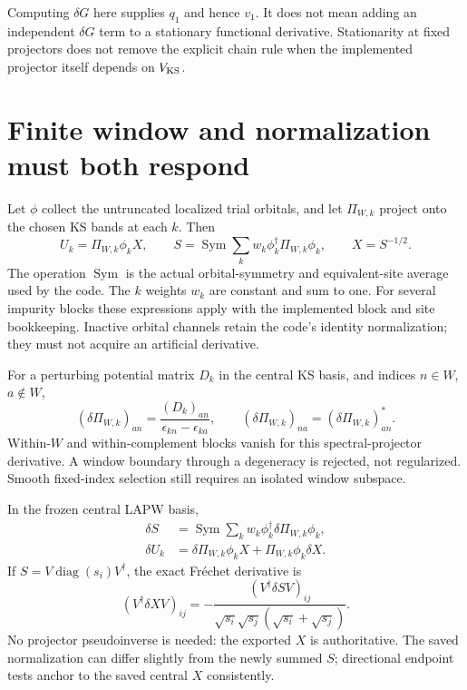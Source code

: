 \documentclass[11pt]{article}
\newcommand{\Sym}{\operatorname{Sym}}
\begin{document}
Computing $\delta G$ here supplies $q_1$ and hence $v_1$. It does not mean
adding an independent $\delta G$ term to a stationary functional derivative.
Stationarity at fixed projectors does not remove the explicit chain rule
when the implemented projector itself depends on $V_{\rm KS}$.

\section{Finite window and normalization must both respond}
Let $\phi$ collect the untruncated localized trial orbitals, and let
$\Pi_{W,k}$ project onto the chosen KS bands at each $k$. Then
\begin{equation}
 U_k=\Pi_{W,k}\phi_k X,\qquad
 S=\Sym\sum_k w_k\phi_k^\dagger\Pi_{W,k}\phi_k,\qquad X=S^{-1/2}.
 \label{eq:projector}
\end{equation}
The operation $\Sym$ is the actual orbital-symmetry and equivalent-site
average used by the code. The $k$ weights $w_k$ are constant and sum to one.
For several impurity blocks these expressions apply with the implemented
block and site bookkeeping. Inactive orbital channels retain the code's
identity normalization; they must not acquire an artificial derivative.

For a perturbing potential matrix $D_k$ in the central KS basis, and
indices $n\in W$, $a\notin W$,
\begin{equation}
 (\delta\Pi_{W,k})_{an}=\frac{(D_k)_{an}}{\epsilon_{kn}-\epsilon_{ka}},
 \qquad
 (\delta\Pi_{W,k})_{na}=(\delta\Pi_{W,k})_{an}^*.
 \label{eq:pi}
\end{equation}
Within-$W$ and within-complement blocks vanish for this spectral-projector
derivative. A window boundary through a degeneracy is rejected, not
regularized. Smooth fixed-index selection still requires an isolated
window subspace.

In the frozen central LAPW basis,
\begin{align}
 \delta S&=\Sym\sum_k w_k\phi_k^\dagger\delta\Pi_{W,k}\phi_k,\\
 \delta U_k&=\delta\Pi_{W,k}\phi_kX+\Pi_{W,k}\phi_k\delta X.
 \label{eq:du}
\end{align}
If $S=V\operatorname{diag}(s_i)V^\dagger$, the exact Fr\'echet derivative is
\begin{equation}
 (V^\dagger\delta X V)_{ij}
 =-\frac{(V^\dagger\delta S V)_{ij}}
 {\sqrt{s_i}\sqrt{s_j}(\sqrt{s_i}+\sqrt{s_j})}.
 \label{eq:dx}
\end{equation}
No projector pseudoinverse is needed: the exported $X$ is authoritative.
The saved normalization can differ slightly from the newly summed $S$;
directional endpoint tests anchor to the saved central $X$ consistently.
\end{document}
